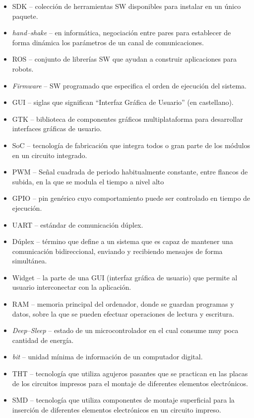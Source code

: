 \begin{itemize}
    \item \ac{SDK} -- colección de herramientas \ac{SW} disponibles para instalar en un único paquete.
    \item \textit{hand--shake} -- en informática, negociación entre pares para establecer de forma dinámica los parámetros de un canal de comunicaciones. 
    \item \ac{ROS} -- conjunto de librerías \ac{SW} que ayudan a construir aplicaciones para robots.
    \item \textit{Firmware} -- \ac{SW} programado que especifica el orden de ejecución del sistema.
    \item \ac{GUI} -- siglas que significan ``Interfaz Gráfica de Usuario'' (en castellano).
    \item \ac{GTK} -- biblioteca de componentes gráficos multiplataforma para desarrollar interfaces gráficas de usuario.
    \item \ac{SoC} -- tecnología de fabricación que integra todos o gran parte de los módulos en un circuito integrado. 
    \item \ac{PWM} -- Señal cuadrada de periodo habitualmente constante, entre flancos de subida, en la que se modula el tiempo a nivel alto
    \item \ac{GPIO} -- pin genérico cuyo comportamiento puede ser controlado en tiempo de ejecución.
    \item \ac{UART} -- estándar de comunicación dúplex.
    \item Dúplex -- término que define a un sistema que es capaz de mantener una comunicación bidireccional, enviando y recibiendo mensajes de forma simultánea.
    \item Widget -- la parte de una GUI (interfaz gráfica de usuario) que permite al usuario interconectar con la aplicación.
    \item \ac{RAM} -- memoria principal del ordenador, donde se guardan programas y datos, sobre la que se pueden efectuar operaciones de lectura y escritura.
    \item \textit{Deep--Sleep} -- estado de un microcontrolador en el cual consume muy poca cantidad de energía.
    \item \textit{bit} -- unidad mínima de información de un computador digital.
    \item \ac{THT} -- tecnología que utiliza agujeros pasantes que se practican en las placas de los circuitos impresos para el montaje de diferentes elementos electrónicos.
    \item \ac{SMD} -- tecnología que utiliza componentes de montaje superficial para la inserción de diferentes elementos electrónicos en un circuito impreso.
\end{itemize}
